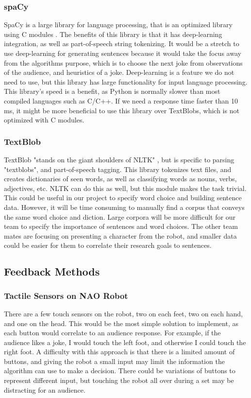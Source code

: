   \subsubsection{spaCy}

  SpaCy is a large library for language processing, that is an optimized library using C modules \cite{spacy}. The benefits of this library is that it has deep-learning integration, as well as part-of-speech string tokenizing. It would be a stretch to use deep-learning for generating sentences because it would take the focus away from the algorithms purpose, which is to choose the next joke from observations of the audience, and heuristics of a joke. Deep-learning is a feature we do not need to use, but this library has large functionality for input language processing. This library's speed is a benefit, as Python is normally slower than most compiled languages such as C/C++. If we need a response time faster than 10 ms, it might be more beneficial to use this library over TextBlobs, which is not optimized with C modules.
  \subsubsection{TextBlob}

  TextBlob "stands on the giant shoulders of NLTK" \cite{textblob}, but is specific to parsing "textblobs", and part-of-speech tagging. This library tokenizes text files, and creates dictionaries of seen words, as well as classifying words as nouns, verbs, adjectives, etc. NLTK can do this as well, but this module makes the task trivial. This could be useful in our project to specify word choice and building sentence data. However, it will be time consuming to manually find a corpus that conveys the same word choice and diction. Large corpora will be more difficult for our team to specify the importance of sentences and word choices. The other team mates are focusing on presenting a character from the robot, and smaller data could be easier for them to correlate their research goals to sentences.

\subsection{Feedback Methods}
  \subsubsection{Tactile Sensors on NAO Robot}
   There are a few touch sensors on the robot, two on each feet, two on each hand, and one on the head. This would be the most simple solution to implement, as each button would correlate to an audience response. For example, if the audience likes a joke, I would touch the left foot, and otherwise I could touch the right foot. A difficulty with this approach is that there is a limited amount of buttons, and giving the robot a small input may limit the information the algorithm can use to make a decision. There could be variations of buttons to represent different input, but touching the robot all over during a set may be distracting for an audience.

